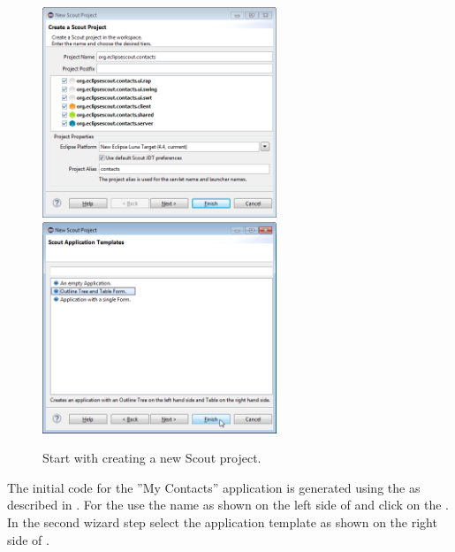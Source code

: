 \documentclass[a4paper,10pt,twoside]{book}
\begin{document}
\begin{figure}
\includegraphics[width=7cm]{new_project_contacts_1.png} \hspace{5mm}
\includegraphics[width=7cm]{new_project_contacts_2.png}
\caption{Start with creating a new Scout project. }
\end{figure}

The initial code for the ''My Contacts'' application is generated using the  as described in . 
For the  use the name  as shown on the left side of  and click on the . 
In the second wizard step select the application template  as shown on the right side of .
\end{document}

